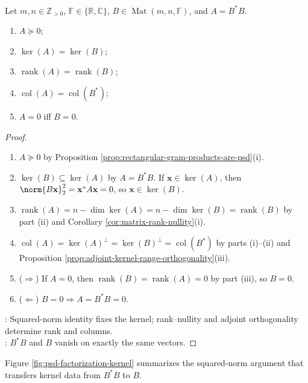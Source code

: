 \begin{theorem} \label{thm:gram-factor-kernel-rank-column-data} \\
Let $m,n\in\mathbb{Z}_{>0}$, $\mathbb{F}\in\{\mathbb{R},\mathbb{C}\}$, $B\in\operatorname{Mat}(m,n,\mathbb{F})$, and $A=B^*B$.
\begin{enumerate}[label=(\roman*)]
\setlength{\itemsep}{0pt}
\item $A\succeq0$;
\item $\ker(A)=\ker(B)$;
\item $\operatorname{rank}(A)=\operatorname{rank}(B)$;
\item $\operatorname{col}(A)=\operatorname{col}(B^*)$;
\item $A=0$ iff $B=0$.
\end{enumerate}
\begin{proof}
\begin{enumerate}[label=(\roman*)]
\setlength{\itemsep}{0pt}
\item[$(i)$] $A\succeq0$ by Proposition \ref{prop:rectangular-gram-products-are-psd}(i).
\item[$(ii)$] $\ker(B)\subseteq\ker(A)$ by $A=B^*B$. If $\mathbf{x}\in\ker(A)$, then $\norm{B\mathbf{x}}_2^2=\mathbf{x}^*A\mathbf{x}=0$, so $\mathbf{x}\in\ker(B)$.
\item[$(iii)$] $\operatorname{rank}(A)=n-\dim\ker(A)=n-\dim\ker(B)=\operatorname{rank}(B)$ by part (ii) and Corollary \ref{cor:matrix-rank-nullity}(i).
\item[$(iv)$] $\operatorname{col}(A)=\ker(A)^\perp=\ker(B)^\perp=\operatorname{col}(B^*)$ by parts (i)--(ii) and Proposition \ref{prop:adjoint-kernel-range-orthogonality}(iii).
\item[$(v)$] ($\Rightarrow$) If $A=0$, then $\operatorname{rank}(B)=\operatorname{rank}(A)=0$ by part (iii), so $B=0$.
\item[$(v)$] ($\Leftarrow$) $B=0\Rightarrow A=B^*B=0$.
\end{enumerate}
: Squared-norm identity fixes the kernel; rank--nullity and adjoint orthogonality determine rank and columns.\\
: $B^*B$ and $B$ vanish on exactly the same vectors.
\end{proof}
\end{theorem}

Figure \ref{fig:psd-factorization-kernel} summarizes the squared-norm argument that transfers kernel data from $B^*B$ to $B$.

